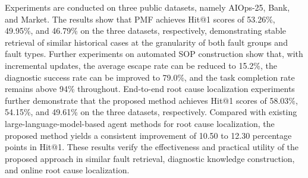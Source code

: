 Experiments are conducted on three public datasets, namely AIOps-25, Bank, and Market. The results show that PMF achieves Hit@1 scores of 53.26\%, 49.95\%, and 46.79\% on the three datasets, respectively, demonstrating stable retrieval of similar historical cases at the granularity of both fault groups and fault types. Further experiments on automated SOP construction show that, with incremental updates, the average escape rate can be reduced to 15.2\%, the diagnostic success rate can be improved to 79.0\%, and the task completion rate remains above 94\% throughout. End-to-end root cause localization experiments further demonstrate that the proposed method achieves Hit@1 scores of 58.03\%, 54.15\%, and 49.61\% on the three datasets, respectively. Compared with existing large-language-model-based agent methods for root cause localization, the proposed method yields a consistent improvement of 10.50 to 12.30 percentage points in Hit@1. These results verify the effectiveness and practical utility of the proposed approach in similar fault retrieval, diagnostic knowledge construction, and online root cause localization.



\pagestyle{enfrontmatterstyle}%
\cleardoublepage\pagestyle{frontmatterstyle}%

